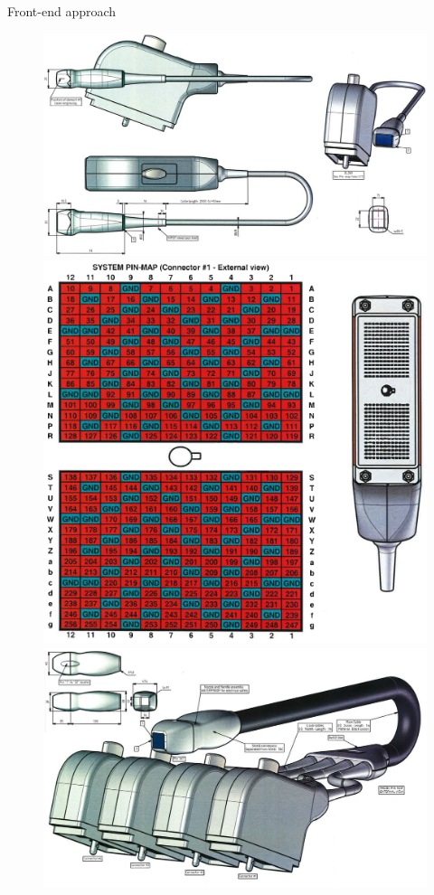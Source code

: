 \documentclass[t,12pt,english
\ifx\beamermode\undefined\else,\beamermode\fi
]{beamer}
\begin{document}
\begin{frame}{Front-end approach}

\begin{figure}[!htb]
\includegraphics[width=.81\textwidth]{31.png}\\
\includegraphics[width=.81\textwidth]{33.png}
\endminipage
{}
\centering
\includegraphics[width=1\textwidth]{32.png}\\

\end{figure}
\end{frame}
\end{document}
